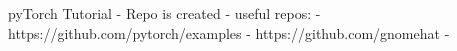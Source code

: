 pyTorch Tutorial
- Repo is created
- useful repos:
 - https://github.com/pytorch/examples
 - https://github.com/gnomehat
- 
